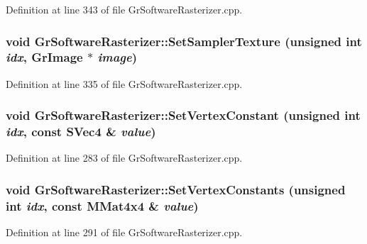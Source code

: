 \begin{CompactItemize}
Definition at line 343 of file GrSoftwareRasterizer.cpp.\hypertarget{class_gr_software_rasterizer_51810eee95ddc746a8a9021773ff6c1b}{
\subsubsection[{SetSamplerTexture}]{\setlength{\rightskip}{0pt plus 5cm}void GrSoftwareRasterizer::SetSamplerTexture (unsigned int {\em idx}, \/  {\bf GrImage} $\ast$ {\em image})}}
\label{class_gr_software_rasterizer_51810eee95ddc746a8a9021773ff6c1b}




Definition at line 335 of file GrSoftwareRasterizer.cpp.\hypertarget{class_gr_software_rasterizer_0c67a108c361c1b57fd133e2a2b2819f}{
\subsubsection[{SetVertexConstant}]{\setlength{\rightskip}{0pt plus 5cm}void GrSoftwareRasterizer::SetVertexConstant (unsigned int {\em idx}, \/  const {\bf SVec4} \& {\em value})}}
\label{class_gr_software_rasterizer_0c67a108c361c1b57fd133e2a2b2819f}




Definition at line 283 of file GrSoftwareRasterizer.cpp.\hypertarget{class_gr_software_rasterizer_ce6f2dcf3bffc89ecbfb4b12a185f06d}{
\subsubsection[{SetVertexConstants}]{\setlength{\rightskip}{0pt plus 5cm}void GrSoftwareRasterizer::SetVertexConstants (unsigned int {\em idx}, \/  const {\bf MMat4x4} \& {\em value})}}
\label{class_gr_software_rasterizer_ce6f2dcf3bffc89ecbfb4b12a185f06d}




Definition at line 291 of file GrSoftwareRasterizer.cpp.\hypertarget{class_gr_software_rasterizer_2a56d53611c7f50e13de3fdbd3b6c0a3}{
}
\end{CompactItemize}
